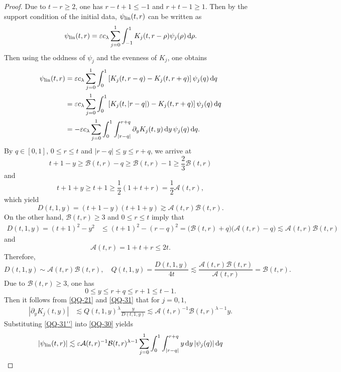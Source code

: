 \documentclass[11pt,twoside]{article}
\newcommand{\p}{\partial}
\newcommand{\ve}{\varepsilon}
\newcommand{\f}{\frac}
\newcommand{\Acal}{\mathcal A}
\newcommand{\Bcal}{\mathcal B}
\newcommand{\dd}{\,\mathrm{d}}
\theoremstyle{plain}
\theoremstyle{definition}
\theoremstyle{remark}
\numberwithin{equation}{section}
\begin{document}
\begin{proof}
Due to $t-r\geq2$, one has $r-t+1\leq-1$ and $r+t-1\geq1$.
Then by the support condition of the initial data, $\psi_{\rm lin}(t,r)$ can be written as
\[
\psi_{\rm lin}(t,r)
=\ve c_\lambda
\sum_{j=0}^1
\int_{-1}^1
K_j(t,r-\rho)\psi_j(\rho)\dd\rho.
\]
Then using the oddness of $\psi_j$ and the evenness of $K_j$, one obtains
\begin{equation}\label{QQ-30}
\begin{aligned}
\psi_{\rm lin}(t,r)
&=\ve c_\lambda
\sum_{j=0}^1
\int_0^1
\left[
K_j(t,r-q)-K_j(t,r+q)
\right]\psi_j(q)\dd q\\
&=\ve c_\lambda
\sum_{j=0}^1
\int_0^1
\left[
K_j(t,|r-q|)-K_j(t,r+q)
\right]\psi_j(q)\dd q\\
&=-\ve c_\lambda
\sum_{j=0}^1
\int_0^1
\int_{|r-q|}^{r+q}
\p_yK_j(t,y)\dd y\,
\psi_j(q)\dd q.
\end{aligned}
\end{equation}
By $q\in[0,1]$, $0\leq r\leq t$ and $|r-q|\leq y\leq r+q$, we arrive at
\[
t+1-y
\geq
\Bcal(t,r)-q
\geq
\Bcal(t,r)-1
\geq
\f23\Bcal(t,r)
\]
and
\[
t+1+y
\geq
t+1
\geq
\f12(1+t+r)=\f12\Acal(t,r),
\]
which yield
\[
D(t,1,y)=(t+1-y)(t+1+y)
\gtrsim
\Acal(t,r)\Bcal(t,r).
\]
On the other hand,  $\Bcal(t,r)\geq3$ and $0\leq r\leq t$ imply that
\[
\begin{aligned}
D(t,1,y)=(t+1)^2-y^2
&\leq
(t+1)^2-(r-q)^2=
\bigl(\Bcal(t,r)+q\bigr)
\bigl(\Acal(t,r)-q\bigr)
\lesssim
\Acal(t,r)\Bcal(t,r)
\end{aligned}
\]
 and
\[
\Acal(t,r)=1+t+r\leq2t.
\]
Therefore,
\begin{equation}\label{QQ-31}
D(t,1,y)\sim\Acal(t,r)\Bcal(t,r),\quad
Q(t,1,y)=\f{D(t,1,y)}{4t}
\lesssim\f{\Acal(t,r)\Bcal(t,r)}{\Acal(t,r)}=\Bcal(t,r).
\end{equation}
Due to $\Bcal(t,r)\geq3$, one has
\[
0\leq y\leq r+q\leq r+1\leq t-1.
\]
Then it follows from \eqref{QQ-21} and \eqref{QQ-31} that for  $j=0,1$,
\begin{equation}\label{QQ-31''}
\begin{aligned}
|\p_yK_j(t,y)|
&\lesssim
Q(t,1,y)^\lambda
\f{y}{D(t,1,y)}\lesssim
\Acal(t,r)^{-1}\Bcal(t,r)^{\lambda-1}y.
\end{aligned}
\end{equation}
Substituting \eqref{QQ-31''} into \eqref{QQ-30} yields
\begin{equation}\label{QQ-32}
\begin{aligned}
|\psi_{\rm lin}(t,r)|
&\lesssim
\ve\Acal(t,r)^{-1}\Bcal(t,r)^{\lambda-1}
\sum_{j=0}^1
\int_0^1
\int_{|r-q|}^{r+q}
y\dd y\,|\psi_j(q)|\dd q\\

\end{aligned}
\end{equation}
\end{proof}
\end{document}
